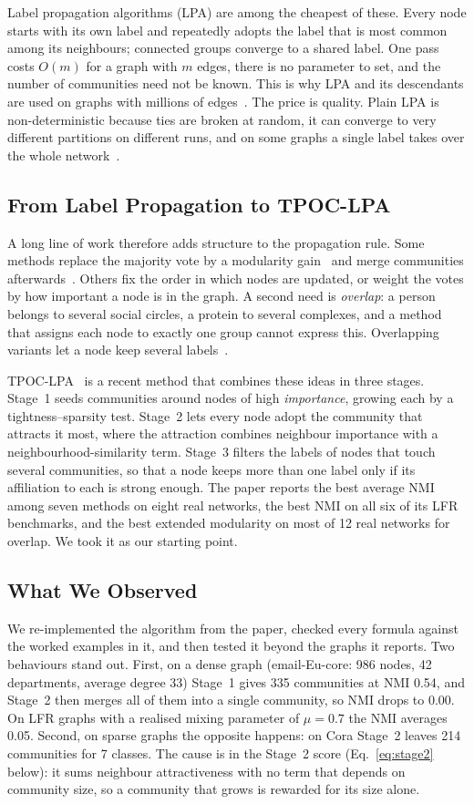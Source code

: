 \documentclass[conference]{IEEEtran}
\begin{document}
Label propagation algorithms (LPA) are among the cheapest of these. Every node starts with its own label and repeatedly adopts the label that is most common among its neighbours; connected groups converge to a shared label. One pass costs $O(m)$ for a graph with $m$ edges, there is no parameter to set, and the number of communities need not be known. This is why LPA and its descendants are used on graphs with millions of edges~\cite{leung2009,traag2023}. The price is quality. Plain LPA is non-deterministic because ties are broken at random, it can converge to very different partitions on different runs, and on some graphs a single label takes over the whole network~\cite{raghavan2007}.

\subsection{From Label Propagation to TPOC-LPA}
A long line of work therefore adds structure to the propagation rule. Some methods replace the majority vote by a modularity gain~\cite{barber2009} and merge communities afterwards~\cite{liu2010}. Others fix the order in which nodes are updated, or weight the votes by how important a node is in the graph. A second need is \emph{overlap}: a person belongs to several social circles, a protein to several complexes, and a method that assigns each node to exactly one group cannot express this. Overlapping variants let a node keep several labels~\cite{gregory2010,xie2011}.

TPOC-LPA~\cite{kong2026} is a recent method that combines these ideas in three stages. Stage~1 seeds communities around nodes of high \emph{importance}, growing each by a tightness--sparsity test. Stage~2 lets every node adopt the community that attracts it most, where the attraction combines neighbour importance with a neighbourhood-similarity term. Stage~3 filters the labels of nodes that touch several communities, so that a node keeps more than one label only if its affiliation to each is strong enough. The paper reports the best average NMI among seven methods on eight real networks, the best NMI on all six of its LFR benchmarks, and the best extended modularity on most of 12 real networks for overlap. We took it as our starting point.

\subsection{What We Observed}
We re-implemented the algorithm from the paper, checked every formula against the worked examples in it, and then tested it beyond the graphs it reports. Two behaviours stand out. First, on a dense graph (email-Eu-core: 986 nodes, 42 departments, average degree 33) Stage~1 gives 335 communities at NMI 0.54, and Stage~2 then merges all of them into a single community, so NMI drops to 0.00. On LFR graphs with a realised mixing parameter of $\mu=0.7$ the NMI averages 0.05. Second, on sparse graphs the opposite happens: on Cora Stage~2 leaves 214 communities for 7 classes. The cause is in the Stage~2 score (Eq.~\eqref{eq:stage2} below): it sums neighbour attractiveness with no term that depends on community size, so a community that grows is rewarded for its size alone.
\end{document}
